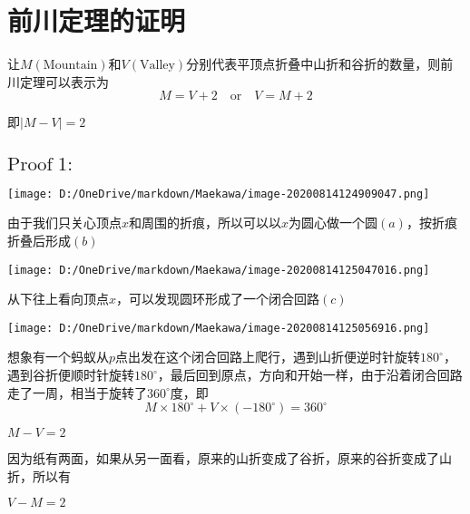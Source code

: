\documentclass[a4paper,12pt]{article}
\begin{document}
\section{前川定理的证明}
让$M(\text{Mountain})$和$V(\text{Valley})$分别代表平顶点折叠中山折和谷折的数量，则前川定理可以表示为
\begin{equation}\label{2}
    M = V +2 \quad \text{or}\quad V = M + 2
\end{equation}
    


即$|M-V|=2$

\subsection{$\text{Proof}\;1:$}
\begin{center}
\texttt{[image: D:/OneDrive/markdown/Maekawa/image-20200814124909047.png]}
\end{center}

由于我们只关心顶点$x$和周围的折痕，所以可以以$x$为圆心做一个圆$(a)$，按折痕折叠后形成$(b)$\\

\begin{center}
\texttt{[image: D:/OneDrive/markdown/Maekawa/image-20200814125047016.png]}\\
\end{center}

从下往上看向顶点$x$，可以发现圆环形成了一个闭合回路$(c)$

\begin{center}
    \texttt{[image: D:/OneDrive/markdown/Maekawa/image-20200814125056916.png]}
\end{center}


想象有一个蚂蚁从$p$点出发在这个闭合回路上爬行，遇到山折便逆时针旋转$180^{\circ}$，遇到谷折便顺时针旋转$180^{\circ}$，最后回到原点，方向和开始一样，由于沿着闭合回路走了一周，相当于旋转了$360^{\circ}$度，即
\begin{equation}\label{1}
    M \times 180^{\circ} +V \times (-180^{\circ}) = 360^{\circ}
\end{equation}

\begin{center}
    $M - V = 2$
\end{center}


因为纸有两面，如果从另一面看，原来的山折变成了谷折，原来的谷折变成了山折，所以有

\begin{center}
    $V - M = 2$
\end{center}
\end{document}
